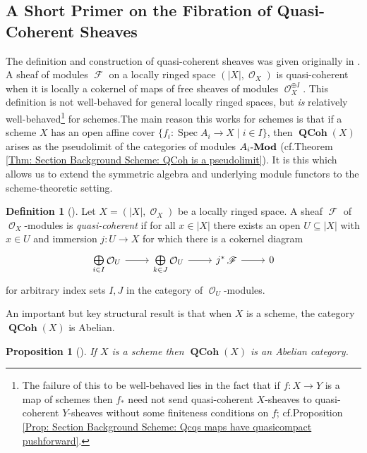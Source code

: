 \documentclass{amsart}
\newtheorem{proposition}[equation]{Proposition}
\theoremstyle{definition}
\newtheorem{definition}[equation]{Definition}
\DeclareMathOperator{\Fscr}{\mathscr{F}}
\DeclareMathOperator{\Ocal}{\mathcal{O}}
\DeclareMathOperator{\Spec}{Spec}
\DeclareMathOperator{\QCoh}{\mathbf{QCoh}}
\newcommand{\Mod}[1]{{#1}\textnormal{-}\mathbf{Mod}}
\numberwithin{equation}{subsection}
\begin{document}
\subsection{A Short Primer on the Fibration of Quasi-Coherent Sheaves}\label{Subsection: QCoh Modules}


The definition and construction of quasi-coherent sheaves was given originally in \cite[Section 5.1.3]{EGA01}. A sheaf of modules $\Fscr$ on a locally ringed space $(\lvert X \rvert, \Ocal_X)$ is quasi-coherent when it is locally a cokernel of maps of free sheaves of modules $\Ocal_X^{\oplus I}$. This definition is not well-behaved for general locally ringed spaces, but \emph{is} relatively well-behaved\footnote{The failure of this to be well-behaved lies in the fact that if $f:X \to Y$ is a map of schemes then $f_{\ast}$ need not send quasi-coherent $X$-sheaves to quasi-coherent $Y$-sheaves without some finiteness conditions on $f$; cf.\@ Proposition \ref{Prop: Section Background Scheme: Qcqs maps have quasicompact pushforward}.} for schemes.The main reason this works for schemes  is that if a scheme $X$ has an open affine cover $\lbrace f_i:\Spec A_i \to X \; | \; i \in I \rbrace$, then $\QCoh(X)$ arises as the pseudolimit of the categories of modules $\Mod{A_i}$ (cf.\@ Theorem \ref{Thm: Section Background Scheme: QCoh is a pseudolimit}). It is this which allows us to extend the symmetric algebra and underlying module functors to the scheme-theoretic setting.

\begin{definition}[{\cite[Section 5.1.3]{EGA01}}]
Let $X = (\lvert X \rvert, \Ocal_X)$ be a locally ringed space. A sheaf $\Fscr$ of $\Ocal_X$-modules is \emph{quasi-coherent} if for all $x \in \lvert X \rvert$ there exists an open $U \subseteq \lvert X \rvert$ with $x \in U$ and immersion $j:U \to X$ for which there is a cokernel diagram
\[
\begin{tikzcd}
\bigoplus\limits_{i \in I} \Ocal_{U} \ar[r] & \bigoplus\limits_{k \in J} \Ocal_{U} \ar[r] & j^{\ast}\Fscr \ar[r] & 0
\end{tikzcd}
\]
for arbitrary index sets $I, J$ in the category of $\Ocal_{U}$-modules.
\end{definition}
An important but key structural result is that when $X$ is a scheme, the category $\QCoh(X)$ is Abelian.
\begin{proposition}[{\cite[Proposition II.5.7]{Hartshorne}}]\label{Prop: Section QCoh: Qcoh Abelian}
If $X$ is a scheme then $\QCoh(X)$ is an Abelian category.
\end{proposition}
\end{document}
